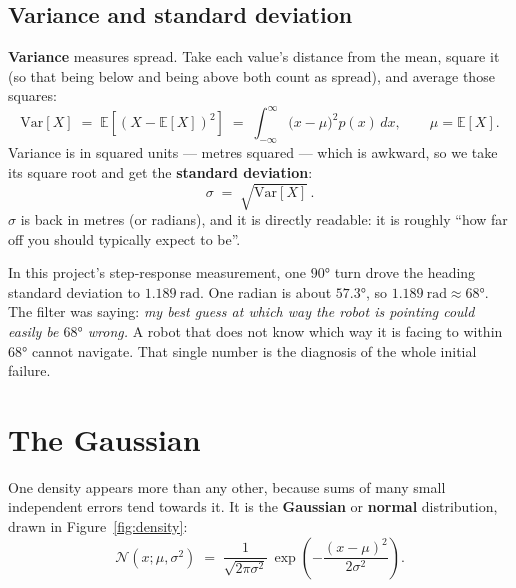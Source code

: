 \documentclass[11pt,a4paper]{report}
\newcommand{\term}[1]{\textcolor{rust}{\textbf{#1}}}
\begin{document}
\subsection{Variance and standard deviation}

\term{Variance} measures spread. Take each value's distance from the mean,
square it (so that being below and being above both count as spread), and
average those squares:
\[
\mathrm{Var}[X] \;=\; \mathbb{E}\!\left[(X - \mathbb{E}[X])^2\right]
\;=\; \int_{-\infty}^{\infty} \bigl(x - \mu\bigr)^2 p(x)\, dx ,
\qquad \mu = \mathbb{E}[X].
\]
Variance is in squared units --- metres squared --- which is awkward, so we
take its square root and get the \term{standard deviation}:
\[
\sigma \;=\; \sqrt{\mathrm{Var}[X]}\, .
\]
$\sigma$ is back in metres (or radians), and it is directly readable: it is
roughly ``how far off you should typically expect to be''.

\begin{keyidea}[What $\sigma_\theta = \SI{1.189}{\radian}$ means]
In this project's step-response measurement, one $\ang{90}$ turn drove the
heading standard deviation to $\SI{1.189}{\radian}$. One radian is about
$\ang{57.3}$, so $\SI{1.189}{\radian} \approx \ang{68}$. The filter was saying:
\emph{my best guess at which way the robot is pointing could easily be
$\ang{68}$ wrong.} A robot that does not know which way it is facing to within
$\ang{68}$ cannot navigate. That single number is the diagnosis of the whole
initial failure.
\end{keyidea}

\section{The Gaussian}

One density appears more than any other, because sums of many small
independent errors tend towards it. It is the \term{Gaussian} or \term{normal}
distribution, drawn in Figure~\ref{fig:density}:
\begin{equation}
\mathcal{N}(x; \mu, \sigma^2)
\;=\; \frac{1}{\sqrt{2\pi\sigma^{2}}}\,
\exp\!\left(-\frac{(x-\mu)^{2}}{2\sigma^{2}}\right).
\label{eq:gaussian}
\end{equation}
\end{document}
